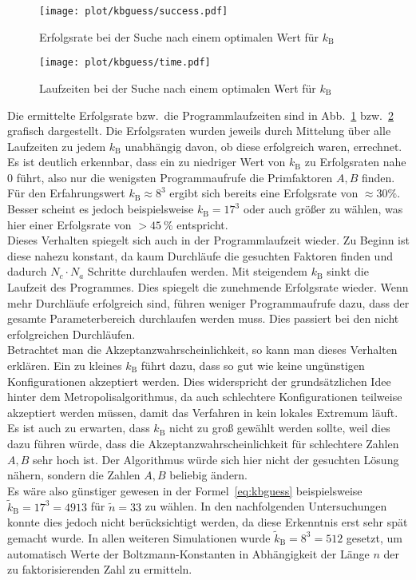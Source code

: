\begin{figure}[h!]
		\centering
		\texttt{[image: plot/kbguess/success.pdf]}
		\caption{Erfolgsrate bei der Suche nach einem optimalen Wert für $k_\mathrm{B}$}\label{fig:kbguess-success}
\end{figure}
\begin{figure}[h!]
		\centering
		\texttt{[image: plot/kbguess/time.pdf]}
		\caption{Laufzeiten bei der Suche nach einem optimalen Wert für $k_\mathrm{B}$}\label{fig:kbguess-runtime}
\end{figure}
Die ermittelte Erfolgsrate bzw.\ die Programmlaufzeiten sind in Abb.~\ref{fig:kbguess-success} bzw.~\ref{fig:kbguess-runtime} grafisch dargestellt. Die Erfolgsraten wurden jeweils durch Mittelung über alle Laufzeiten zu jedem $k_\mathrm{B}$ unabhängig davon, ob diese erfolgreich waren, errechnet. \\
Es ist deutlich erkennbar, dass ein zu niedriger Wert von $k_\mathrm{B}$ zu Erfolgsraten nahe $0$ führt, also nur die wenigsten Programmaufrufe die Primfaktoren $A,B$ finden. Für den Erfahrungswert $k_\mathrm{B}\approx 8^3$ ergibt sich bereits eine Erfolgsrate von $\approx30\%$. Besser scheint es jedoch beispielsweise $k_\mathrm{B}=17^3$ oder auch größer zu wählen, was hier einer Erfolgsrate von $>\SI{45}{\percent}$ entspricht. \\
Dieses Verhalten spiegelt sich auch in der Programmlaufzeit wieder. Zu Beginn ist diese nahezu konstant, da kaum Durchläufe die gesuchten Faktoren finden und dadurch $N_c\cdot N_a$ Schritte durchlaufen werden. Mit steigendem $k_\mathrm{B}$ sinkt die Laufzeit des Programmes. Dies spiegelt die zunehmende Erfolgsrate wieder. Wenn mehr Durchläufe erfolgreich sind, führen weniger Programmaufrufe dazu, dass der gesamte Parameterbereich durchlaufen werden muss. Dies passiert bei den nicht erfolgreichen Durchläufen. \\
Betrachtet man die Akzeptanzwahrscheinlichkeit, so kann man dieses Verhalten erklären. Ein zu kleines $k_\mathrm{B}$ führt dazu, dass so gut wie keine ungünstigen Konfigurationen akzeptiert werden. Dies widerspricht der grundsätzlichen Idee hinter dem Metropolisalgorithmus, da auch schlechtere Konfigurationen teilweise akzeptiert werden müssen, damit das Verfahren in kein lokales Extremum läuft. Es ist auch zu erwarten, dass $k_\mathrm{B}$ nicht zu groß gewählt werden sollte, weil dies dazu führen würde, dass die Akzeptanzwahrscheinlichkeit für schlechtere Zahlen $A, B$ sehr hoch ist. Der Algorithmus würde sich hier nicht der gesuchten Lösung nähern, sondern die Zahlen $A, B$ beliebig ändern. \\
Es wäre also günstiger gewesen in der Formel~\eqref{eq:kbguess} beispielsweise $\tilde{k}_\mathrm{B}=17^3=4913$ für $\tilde{n}=33$ zu wählen. In den nachfolgenden Untersuchungen konnte dies jedoch nicht berücksichtigt werden, da diese Erkenntnis erst sehr spät gemacht wurde. In allen weiteren Simulationen wurde $\tilde{k}_\mathrm{B}=8^3=512$ gesetzt, um automatisch Werte der Boltzmann-Konstanten in Abhängigkeit der Länge $n$ der zu faktorisierenden Zahl zu ermitteln.

